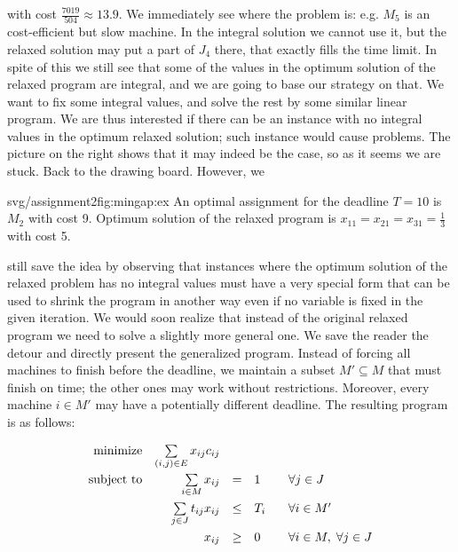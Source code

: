 \noindent
\begin{minipage}[t]{0.5\textwidth}
  \vskip 0pt
\noindent
with cost  $\frac{7019}{504}\approx 13.9$. 
We immediately see where the problem is: e.g. $M_5$ is an cost-efficient but slow machine. In the integral 
solution we cannot use it, but the relaxed solution may put a part of $J_4$ there, that exactly fills the time
limit. In spite of this we still see that some of the values in the optimum solution of the relaxed program are 
integral, and we are going to base our strategy on that. We want to fix some integral values, and solve the rest
by some similar linear program. We are thus interested if there can be an instance with no integral values in 
the optimum relaxed solution; such instance would cause problems. The picture on the right shows that it 
may indeed be the case, so as it seems we are stuck. Back to the drawing board. However, we 
\end{minipage}\begin{minipage}[t]{0.5\textwidth}
  \begin{myfiglabel}{0.7\textwidth}{svg/assignment2}{fig:mingap:ex}
    An optimal assignment for the deadline $T=10$ is $M_2$ with cost 9.
    Optimum solution of the relaxed program is $x_{11}=x_{21}=x_{31}=\frac{1}{3}$
    with cost 5.
  \end{myfiglabel}
\end{minipage}
\noindent
still save the idea
by observing 
that instances where the optimum solution of the relaxed problem has no integral values must have a very
special form that can be used to shrink the program in another way even if no variable is fixed in the given
iteration. We would soon realize that instead of the original relaxed program we need to solve a slightly more
general one. We save the reader the detour and directly present the generalized program. Instead of 
forcing all machines to finish before the deadline, we maintain a subset $M'\subseteq M$ that must
finish on time; the other ones may work without restrictions. Moreover, every machine $i\in M'$ may have
a potentially different deadline. The resulting program is as follows:

\begin{equation}
\label{eq:mingap:lp}
\begin{array}{rrcll}
  {\rm minimize}     & \multicolumn{1}{l}{ \sum\limits_{(i,j)\in E}x_{ij}c_{ij}}\\[4mm]
  {\rm subject\ to} & \sum\limits_{i\in M} x_{ij}& = &1 & \;\;\; \forall j\in J\\[4mm]
                          & \sum\limits_{j\in J} t_{ij}x_{ij}&\le & T_i & \;\;\; \forall i\in M'\\[4mm]
                          & x_{ij} & \ge & 0 & \;\;\; \forall i\in M, \; \forall j\in J
\end{array}
\end{equation}

